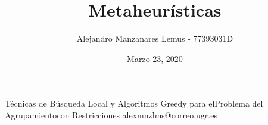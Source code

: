 \documentclass[10pt]{report}
\author{Alejandro Manzanares Lemus - 77393031D}
\title{Metaheurísticas}
\date{Marzo 23, 2020}
\begin{document}
            {Técnicas de Búsqueda Local y Algoritmos Greedy para elProblema del Agrupamientocon Restricciones}
            {alexmnzlms@correo.ugr.es}

\tableofcontents



\end{document}
